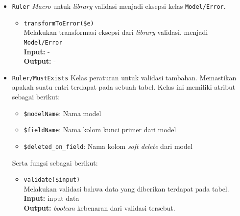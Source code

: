 \begin{itemize}
        \item \texttt{Ruler} \textit{Macro} untuk \textit{library} validasi
            menjadi eksepsi kelas \texttt{Model/Error}.
            \begin{itemize}
                \item \texttt{transformToError(\$e)} \\
                    Melakukan transformasi eksepsi dari \textit{library}
                    validasi, menjadi \texttt{Model/Error} \\
                    \textbf{Input:} -\\
                    \textbf{Output:} -
            \end{itemize}
            
        \item \texttt{Ruler/MustExists} Kelas peraturan untuk validasi tambahan.
            Memastikan apakah suatu entri terdapat pada sebuah tabel. Kelas ini
            memiliki atribut sebagai berikut:
            \begin{itemize}
                \item \texttt{\$modelName}: Nama model
                \item \texttt{\$fieldName}: Nama kolom kunci primer dari model
                \item \texttt{\$deleted\_on\_field}: Nama kolom \textit{soft
                delete} dari model
            \end{itemize}
            Serta fungsi sebagai berikut:
            \begin{itemize}
                \item \texttt{validate(\$input)} \\
                    Melakukan validasi bahwa data yang diberikan terdapat pada
                    tabel.\\
                    \textbf{Input:} input data\\
                    \textbf{Output:} \textit{boolean} kebenaran dari validasi
                    tersebut.
            \end{itemize}
            

\end{itemize}
